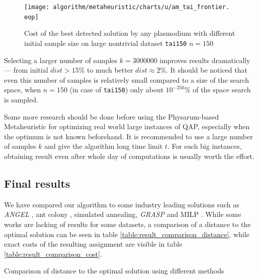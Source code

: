 \documentclass[english,a4paper,twoside]{ppfcmthesis}
\begin{document}
\begin{figure}
  \centering

  \texttt{[image: algorithm/metaheuristic/charts/u/am\_tai\_frontier.\\eop]}

  \caption{Cost of the best detected solution by any plasmodium with different initial sample size on large nontrivial dataset \texttt{tai150} $n=150$}
  \label{figure:am_tai_frontier}
\end{figure}

Selecting a larger number of samples $k=3000000$ improves results dramatically --- from initial $dist>15\%$ to much better $dist{\approx}2\%$. It should be noticed that even this number of samples is relatively small compared to a size of the search space, when $n=150$ (in case of \texttt{tai150}) only about $10^{-250}\%$ of the space search is sampled.

Some more research should be done before using the Physarum-based Metaheuristic for optimizing real world large instances of QAP, especially when the optimum is not known beforehand. It is recommended to use a large number of samples $k$ and give the algorithm long time limit $t$. For such big instances, obtaining result even after whole day of computations is usually worth the effort.

\subsection{Final results}

We have compared our algorithm to some industry leading solutions such as \textit{ANGEL} \cite{tseng2006hybrid}, ant colony \cite{maniezzo1999ant}, simulated annealing, \textit{GRASP} and MILP \cite{karami2013analysis}. While some works are lacking of results for some datasets, a comparison of a distance to the optimal solution can be seen in table \ref{table:result_comparison_distance}, while exact costs of the resulting assignment are visible in table \ref{table:result_comparison_cost}.

\begin{table}
  \centering
  \caption{Comparison of distance to the optimal solution using different methods \cite{tseng2006hybrid, karami2013analysis, ramakrishnan1998tight, maniezzo1999ant}}
  \label{table:result_comparison_distance}

\end{table}
\end{document}
